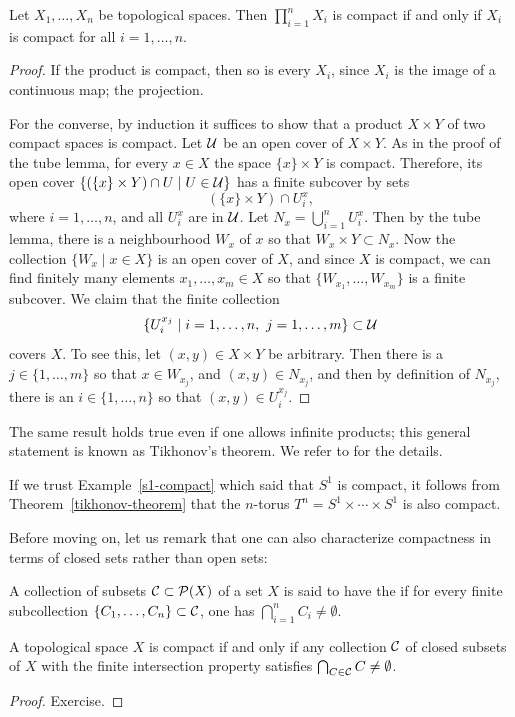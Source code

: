 \begin{thm}
  \label{tikhonov-theorem}
  Let $X_1, \dots, X_n$ be topological spaces. Then $\prod_{i=1}^n X_i$ is compact if and only if $X_i$ is compact for all $i = 1, \dots, n$.
\end{thm}
\begin{proof}
  If the product is compact, then so is every $X_i$, since $X_i$ is the image of a continuous map; the projection.
  
  For the converse, by induction it suffices to show that a product $X \times Y$ of two compact spaces is compact. Let $\mathcal{U}$ be an open cover of $X \times Y$. As in the proof of the tube lemma, for every $x \in X$ the space $\{x \} \times Y$ is compact. Therefore, its open cover $\{ (\{x\} \times Y) \cap U \mid U \in \mathcal{U}\}$ has a finite subcover by sets
  \[
    (\{x\} \times Y) \cap U_i^x,
  \]
  where $i = 1, \dots, n$, and all $U_i^x$ are in $\mathcal{U}$. Let $N_x = \bigcup_{i=1}^n U_i^x$. Then by the tube lemma, there is a neighbourhood $W_x$ of $x$ so that $W_x \times Y \subset N_x$. Now the collection $\{W_x \mid x \in X\}$ is an open cover of $X$, and since $X$ is compact, we can find finitely many elements $x_1, \dots, x_m \in X$ so that $\{W_{x_1}, \dots, W_{x_m}\}$ is a finite subcover. We claim that the finite collection
  \[
    \{U_i^{x_j} \mid i = 1, \dots, n,\ j = 1, \dots, m \} \subset \mathcal{U}
  \]
  covers $X$. To see this, let $(x,y) \in X \times Y$ be arbitrary. Then there is a $j \in \{1, \dots, m\}$ so that $x \in W_{x_j}$, and $(x,y) \in N_{x_j}$, and then by definition of $N_{x_j}$, there is an $i \in \{1, \dots, n\}$ so that $(x,y) \in U_i^{x_j}$.
\end{proof}
\begin{rem}
  The same result holds true even if one allows infinite products; this general statement is known as Tikhonov's theorem. We refer to \cite[\S 37]{Mun} for the details.
\end{rem}
\begin{example}
  If we trust Example~\ref{s1-compact} which said that $S^1$ is compact, it follows from Theorem~\ref{tikhonov-theorem} that the $n$-torus $T^n = S^1 \times \cdots \times S^1$ is also compact.
\end{example}
Before moving on, let us remark that one can also characterize compactness in terms of closed sets rather than open sets:
\begin{defn}
  A collection of subsets $\mathcal{C} \subset \mathcal{P}(X)$ of a set $X$ is said to have the  if for every finite subcollection $\{C_1, \dots, C_n\} \subset \mathcal{C}$, one has $\bigcap_{i=1}^n C_i \not= \emptyset$.
\end{defn}
\begin{prop}
  A topological space $X$ is compact if and only if any collection $\mathcal{C}$ of closed subsets of $X$ with the finite intersection property satisfies $\bigcap_{C \in \mathcal{C}} C \not= \emptyset$.
\end{prop}
\begin{proof}
  Exercise.
\end{proof}

